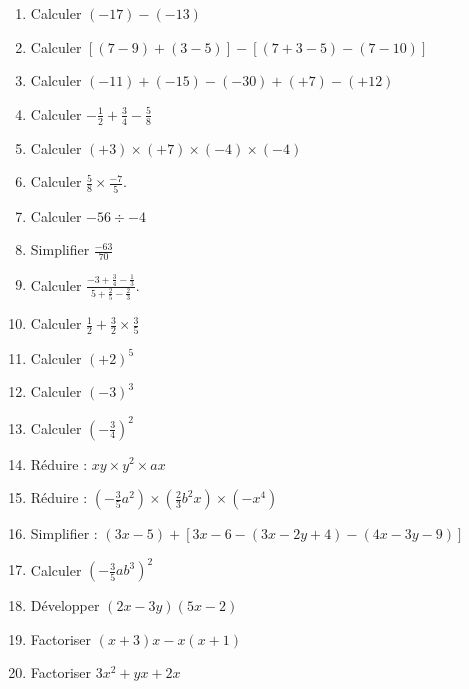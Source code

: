 \documentclass[12 pt]{extarticle}
\theoremstyle{plain}
\begin{document}
 \begin{enumerate}
 \item Calculer $(-17)-(-13)$
 \item Calculer $[(7-9)+(3-5)]-[(7+3-5)-(7-10)]$
 \item Calculer $(-11)+(-15)-(-30)+(+7)-(+12)$
 \item Calculer $-\frac12+\frac34-\frac58$
 \item Calculer $(+3)\times (+7)\times (- 4)\times (-4)$
 \item Calculer $\displaystyle\frac58\times \frac{-7}5$.
 \item Calculer $-56 \div -4$
 \item Simplifier $\displaystyle\frac{-63}{70}$
 \item Calculer $\displaystyle\frac{-3+\frac34-\frac13}{5+\frac25-\frac23}$.
 \item Calculer $\frac12+\frac32\times \frac35$
 \item Calculer $(+2)^5$
 \item Calculer $(-3)^3$
 \item Calculer $\displaystyle\left(-\frac34\right)^2$
 \item Réduire : $xy \times y^2 \times ax$
 \item Réduire : $\displaystyle\left(-\frac35a^2\right)\times \left(\frac23b^2x\right)\times (-x^4)$
 \item Simplifier : $(3x-5) + [3x-6-(3x-2y+4)-(4x-3y-9)]$
 \item Calculer $\left(-\frac35ab^3\right)^2$
 \item Développer $(2x-3y)(5x-2)$
 \item Factoriser $(x+3)x - x(x+1)$
 \item Factoriser $3x^2 + yx + 2x$
 
 \end{enumerate}
  
 	
\end{document}
